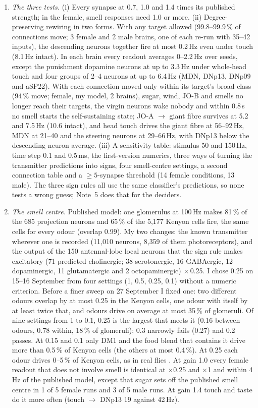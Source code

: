 \begin{enumerate}[leftmargin=*, label=\arabic*., itemsep=4pt]
\item \emph{The three tests.} (i) Every synapse at 0.7, 1.0 and 1.4 times its published strength; in the female, smell responses need 1.0 or more. (ii) Degree-preserving rewiring \citep{maslov2002specificity} in two forms. With any target allowed (99.8--99.9\,\% of connections move; 3 female and 2 male brains, one of each re-run with 35--42 inputs), the descending neurons together fire at most 0.2\,Hz even under touch (8.1\,Hz intact). In each brain every readout averages 0--2.2\,Hz over seeds, except the punishment dopamine neurons at up to 3.3\,Hz under whole-head touch and four groups of 2--4 neurons at up to 6.4\,Hz (MDN, DNp13, DNp09 and aSP22). With each connection moved only within its target's broad class (94\,\% move; female, my model, 2 brains), sugar, wind, JO-B and smells no longer reach their targets, the virgin neurons wake nobody and within 0.8\,s no smell starts the self-sustaining state; JO-A $\rightarrow$ giant fibre survives at 5.2 and 7.5\,Hz (10.6 intact), and head touch drives the giant fibre at 56--92\,Hz, MDN at 21--40 and the steering neurons at 29--66\,Hz, with DNp13 below the descending-neuron average. (iii) A sensitivity table: stimulus 50 and 150\,Hz, time step 0.1 and 0.5\,ms, the first-version numerics, three ways of turning the transmitter predictions into signs, four smell-centre settings, a second connection table and a $\geq 5$-synapse threshold (14 female conditions, 13 male). The three sign rules all use the same classifier's predictions, so none tests a wrong guess; Note~5 does that for the deciders.

\item \emph{The smell centre.} Published model: one glomerulus at 100\,Hz makes 81\,\% of the 685 projection neurons and 65\,\% of the 5{,}177 Kenyon cells fire, the same cells for every odour (overlap 0.99). My two changes: the known transmitter wherever one is recorded (11{,}010 neurons, 8{,}359 of them photoreceptors), and the output of the 150 antennal-lobe local neurons that the sign rule makes excitatory (71 predicted cholinergic; 38 serotonergic, 16 GABAergic, 12 dopaminergic, 11 glutamatergic and 2 octopaminergic) $\times$\,0.25. I chose 0.25 on 15--16 September from four settings (1, 0.5, 0.25, 0.1) without a numeric criterion. Before a finer sweep on 27 September I fixed one: two different odours overlap by at most 0.25 in the Kenyon cells, one odour with itself by at least twice that, and odours drive on average at most 35\,\% of glomeruli. Of nine settings from 1 to 0.1, 0.25 is the largest that meets it (0.16 between odours, 0.78 within, 18\,\% of glomeruli); 0.3 narrowly fails (0.27) and 0.2 passes. At 0.15 and 0.1 only DM1 and the food blend that contains it drive more than 0.5\,\% of Kenyon cells (the others at most 0.4\,\%). At 0.25 each odour drives 0--5\,\% of Kenyon cells, as in real flies \citep{honegger2011cellular}. At gain 1.0 every female readout that does not involve smell is identical at $\times$0.25 and $\times$1 and within 4\,Hz of the published model, except that sugar sets off the published smell centre in 1 of 5 female runs and 3 of 5 male runs. At gain 1.4 touch and taste do it more often (touch $\rightarrow$ DNp13 19 against 42\,Hz).


\end{enumerate}
